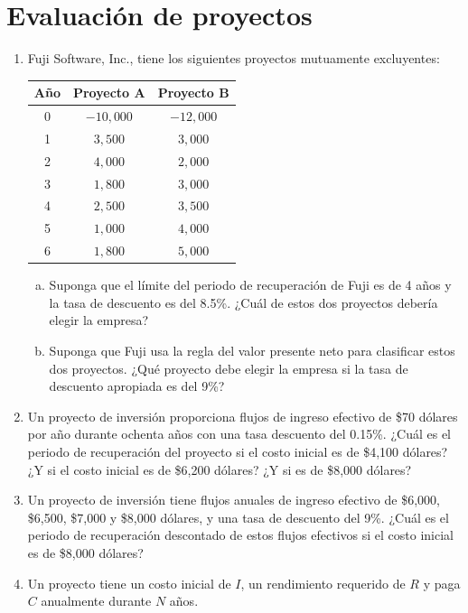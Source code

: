 \documentclass{article}
\begin{document}
\section{Evaluación de proyectos}
\begin{enumerate}
    \item Fuji Software, Inc., tiene los siguientes proyectos mutuamente excluyentes:

    \begin{center}
    \begin{tabular}{|c|c|c|}
        \hline
        Año & Proyecto A & Proyecto B \\
        \hline
        0 & $-10,000$ & $-12,000$ \\
        1 & $3,500$ & $3,000$ \\
        2 & $4,000$ & $2,000$ \\
        3 & $1,800$ & $3,000$ \\
        4 & $2,500$ & $3,500$ \\
        5 & $1,000$ & $4,000$ \\
        6 & $1,800$ & $5,000$ \\
        \hline
    \end{tabular}
    \end{center}
    
    \begin{enumerate}[(a)]
        \item Suponga que el límite del periodo de recuperación de Fuji es de 4 años y la tasa de descuento es del 8.5\%. ¿Cuál de estos dos proyectos debería elegir la empresa?
        \item Suponga que Fuji usa la regla del valor presente neto para clasificar estos dos proyectos. ¿Qué proyecto debe elegir la empresa si la tasa de descuento apropiada es del 9\%?
    \end{enumerate}
    
    \item Un proyecto de inversión proporciona flujos de ingreso efectivo de \$70 dólares por año durante ochenta años con una tasa descuento del 0.15\%. ¿Cuál es el periodo de recuperación del proyecto si el costo inicial es de \$4,100 dólares? ¿Y si el costo inicial es de \$6,200 dólares? ¿Y si es de \$8,000 dólares?
    
    \item Un proyecto de inversión tiene flujos anuales de ingreso efectivo de \$6,000, \$6,500, \$7,000 y \$8,000 dólares, y una tasa de descuento del 9\%. ¿Cuál es el periodo de recuperación descontado de estos flujos efectivos si el costo inicial es de \$8,000 dólares?
    \item Un proyecto tiene un costo inicial de $I$, un rendimiento requerido de $R$ y paga $C$ anualmente durante $N$ años.


\end{enumerate}
\end{document}
